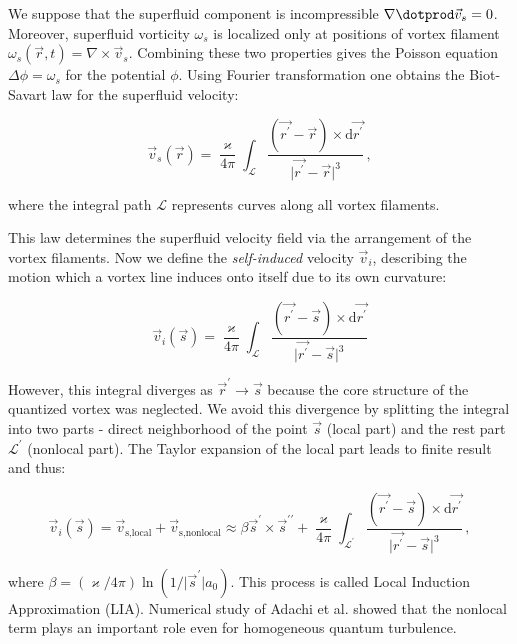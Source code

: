 We suppose that the superfluid component is incompressible $\nabla \dotprod \vec{v}_s = 0$. Moreover, superfluid vorticity $\omega_s$ is localized only at positions of vortex filament $\omega_s(\vec{r},t) = \nabla \times \vec{v}_s$. Combining these two properties gives the Poisson equation $\Delta \phi = \omega_s$ for the potential $\phi$.
Using Fourier transformation one obtains the Biot-Savart law for the superfluid velocity:

\begin{equation}
\vec{v}_s(\vec{r}) = \frac{\varkappa}{4\pi} \int_{\mathcal{L}} \frac{(\vec{r^{\prime}} - \vec{r}) \times \text{d}\vec{r^{\prime}}}{\vert \vec{r^{\prime}} - \vec{r} \vert^3}\,,
\end{equation}

where the integral path $\mathcal{L}$ represents curves along all vortex filaments.

This law determines the superfluid velocity field via the arrangement of the vortex
filaments. Now we define the \textit{self-induced} velocity $\vec{v}_i$, describing the motion which a vortex line induces onto itself due to its own curvature:

\begin{equation}
\vec{v}_i(\vec{s}) = \frac{\varkappa}{4\pi} \int_{\mathcal{L}} \frac{(\vec{r^{\prime}} - \vec{s}) \times \text{d}\vec{r^{\prime}}}{\vert \vec{r^{\prime}} - \vec{s} \vert^3}
\end{equation}

However, this integral diverges as $\vec{r}^{\prime} \rightarrow \vec{s}$ because the core structure
of the quantized vortex was neglected. We avoid this divergence by splitting the integral into two parts - direct neighborhood of the point $\vec{s}$ (local part) and the rest part $\mathcal{L}^{\prime}$ (nonlocal part). The Taylor expansion of the local part leads to finite result and thus:

\begin{equation}
\vec{v}_i(\vec{s})
= \vec{v}_{\text{s,local}} + \vec{v}_{\text{s,nonlocal}}
\approx \beta \vec{s}^{\prime} \times \vec{s}^{\prime \prime} + \frac{\varkappa}{4\pi} \int_{\mathcal{L}^{\prime}} \frac{(\vec{r^{\prime}} - \vec{s}) \times \text{d}\vec{r^{\prime}}}{\vert \vec{r^{\prime}} - \vec{s} \vert^3}\,,
\label{lia+biot}
\end{equation}

where $\beta = (\varkappa / 4\pi) \ln(1/\vert\vec{s}^{\prime}\vert a_0)$. This process is called Local Induction Approximation (LIA). Numerical study of Adachi et al. showed that the nonlocal term plays an important role even for homogeneous quantum turbulence.

